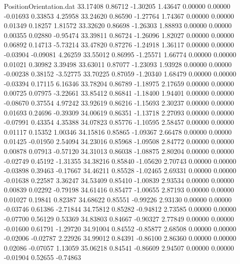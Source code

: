 \begin{filecontents}{PositionOrientation.dat}
  33.17408    0.86712   -1.30205     1.43647    0.00000    0.00000   -0.01693    0.33853    4.25958
  33.24620    0.86590   -1.27764     1.74367    0.00000    0.00000    0.01349    0.18257    1.81572
  33.32620    0.86698   -1.26303     1.88893    0.00000    0.00000    0.00355    0.02880   -0.95474
  33.39811    0.86724   -1.26096     1.82027    0.00000    0.00000    0.06892    0.14713   -5.73214
  33.47820    0.87276   -1.24918     1.36117    0.00000    0.00000   -0.03904   -0.09081    4.26259
  33.55012    0.86995   -1.25571     1.66774    0.00000    0.00000    0.01021    0.30982    3.39498
  33.63011    0.87077   -1.23093     1.93928    0.00000    0.00000   -0.00238    0.38152   -3.52775
  33.70225    0.87059   -1.20340     1.68479    0.00000    0.00000   -0.03394    0.17115    6.16346
  33.78204    0.86789   -1.18975     2.17659    0.00000    0.00000    0.00725    0.07975   -3.22661
  33.85412    0.86841   -1.18400     1.94401    0.00000    0.00000   -0.08670    0.37554    4.97242
  33.92619    0.86216   -1.15693     2.30237    0.00000    0.00000    0.01693    0.24696   -0.39309
  34.00619    0.86351   -1.13718     2.27093    0.00000    0.00000   -0.07991    0.43354    4.35388
  34.07823    0.85776   -1.10595     2.58457    0.00000    0.00000    0.01117    0.15352    1.00346
  34.15816    0.85865   -1.09367     2.66478    0.00000    0.00000    0.01425   -0.01950    2.54094
  34.23016    0.85968   -1.09508     2.84772    0.00000    0.00000    0.00878    0.07913   -0.57120
  34.31013    0.86038   -1.08875     2.80204    0.00000    0.00000   -0.02749    0.45192   -1.31355
  34.38216    0.85840   -1.05620     2.70743    0.00000    0.00000   -0.03898    0.39463   -0.17667
  34.46211    0.85528   -1.02465     2.69331    0.00000    0.00000   -0.01638    0.22587    3.36247
  34.53409    0.85410   -1.00839     2.93534    0.00000    0.00000    0.00839    0.02292   -0.79198
  34.61416    0.85477   -1.00655     2.87193    0.00000    0.00000    0.01027    0.19841    0.82387
  34.68622    0.85551   -0.99226     2.93130    0.00000    0.00000   -0.03746    0.61386   -2.71844
  34.75812    0.85282   -0.94812     2.73585    0.00000    0.00000   -0.07700    0.56129    0.53369
  34.83803    0.84667   -0.90327     2.77849    0.00000    0.00000   -0.01600    0.61791   -1.29720
  34.91004    0.84552   -0.85877     2.68508    0.00000    0.00000   -0.02006   -0.02787    2.22926
  34.99012    0.84391   -0.86100     2.86360    0.00000    0.00000    0.02086   -0.07057    1.13059
  35.06218    0.84541   -0.86609     2.94507    0.00000    0.00000   -0.01904    0.52655   -0.74863

\end{filecontents}
